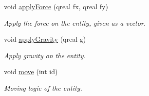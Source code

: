 \begin{DoxyCompactItemize}
void \hyperlink{class_dynamic_entity_abc03ef71bd387e232fbcd3e35f9f634d}{apply\+Force} (qreal fx, qreal fy)
\begin{DoxyCompactList}\small\item\em Apply the force on the entity, given as a vector. \end{DoxyCompactList}\item 
void \hyperlink{class_dynamic_entity_ac9d7063f7165c9dc9a050361d9d9ebae}{apply\+Gravity} (qreal g)
\begin{DoxyCompactList}\small\item\em Apply gravity on the entity. \end{DoxyCompactList}\item 
void \hyperlink{class_dynamic_entity_aed1bbf1428250f9db5b8b141edf5ba50}{move} (int id)
\begin{DoxyCompactList}\small\item\em Moving logic of the entity. \end{DoxyCompactList}\end{DoxyCompactItemize}
